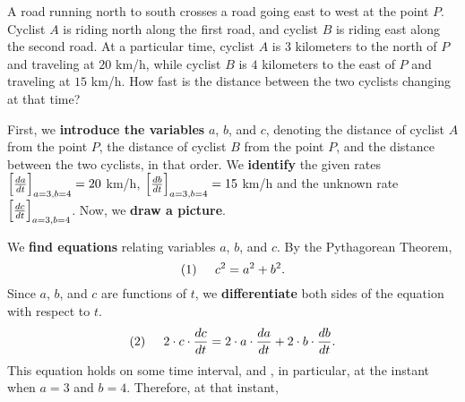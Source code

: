 \documentclass{ximera}
\begin{document}
\begin{example}
A road running north to south crosses a road going east to west at the
point $P$.  Cyclist $A$ is riding north along the first road, and
cyclist $B$ is riding east along the second road.  At a particular
time, cyclist $A$ is $3$ kilometers to the north of $P$ and traveling
at $20$ km/h, while cyclist $B$ is $4$ kilometers to the east of $P$
and traveling at $15$ km/h.  How fast is the distance between the two
cyclists changing at that time?


\begin{explanation}
First, we \textbf{introduce the variables} $a$, $b$, and $c$, denoting the distance of cyclist $A$ from the point $P$, the distance of cyclist $B$ from the point $P$, and the distance between the two cyclists, in that order. We \textbf{identify} the given rates $\Bigl[\frac{da}{dt}\Bigr]_{a=3, b=4}=20$ km/h, $\Bigl[\frac{db}{dt}\Bigr]_{a=3, b=4}=15$ km/h  and the unknown rate $\Bigl[\frac{dc}{dt}\Bigr]_{a=3, b=4}$. 
Now, we \textbf{draw a picture}.
\begin{image}
\end{image}
We \textbf{find equations} relating variables $a$, $b$, and $c$.  By the Pythagorean Theorem,
\[
(1)\hspace{0.2in}c^2=a^2+b^2.
\] 
Since  $a$, $b$, and $c$ are functions of $t$, we \textbf{differentiate} both sides of  the equation with respect to $t$. 
\[
(2)\hspace{0.2in}2\cdot c\cdot \frac{dc}{dt}=2\cdot a\cdot \frac{da}{dt}+2\cdot b\cdot \frac{db}{dt}.
\]
This equation holds on some time interval, and , in particular, at the instant when $a=3$ and $b=4$. Therefore, at that instant,


\end{explanation}
\end{example}
\end{document}
